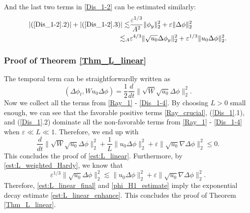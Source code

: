 \documentclass[reqno, 11pt]{amsart}
\theoremstyle{plain}
\theoremstyle{definition}
\theoremstyle{remark}
\numberwithin{equation}{section}
\begin{document}
And the last two terms in \eqref{Dis_1-2} can be estimated similarly:
\begin{equation}\label{Dis_1-4}
\begin{aligned}
|(\ref{Dis_1-2}.2)| + |(\ref{Dis_1-2}.3)| \lesssim & \frac{\varepsilon^{1/3}}{A^2}\|\phi_y\|_2^2 + \varepsilon \| \Delta \phi \|_2^2\\
\lesssim_A &  \varepsilon^{4/3} \|\sqrt{u_0} \Delta \phi_y\|_2^2 + \varepsilon^{1/3} \|u_0 \Delta \phi\|_2^2.
\end{aligned}
\end{equation}

\subsubsection{Proof of Theorem \ref{Thm_L_linear}} The temporal term can be straightforwardly written as
$$
(\Delta \phi_t, W u_0 \Delta \phi) = \frac{1}{2} \frac{d}{dt} \| \sqrt{W} \sqrt{u_0} \Delta \phi \|_2^2.
$$
Now we collect all the terms from \eqref{Ray_1} - \eqref{Dis_1-4}. By choosing  $L > 0$ small enough, we can see that the favorable positive terms \eqref{Ray_crucial}, (\ref{Dis_1}.1), and (\ref{Dis_1}.2) dominate all the non-favorable terms from \eqref{Ray_1} - \eqref{Dis_1-4} when $\varepsilon \ll L \ll 1$. Therefore, we end up with
\begin{equation}\label{est:L_linear_final}
\frac{d}{dt} \|\sqrt{W} \sqrt{u_0} \Delta \phi \|_2^2 + \frac{1}{L} \|u_0 \Delta \phi\|_2^2 + \varepsilon \| \sqrt{u_0} \nabla \Delta \phi \|_2^2 \le 0.
\end{equation}
This concludes the proof of \eqref{est:L_linear}. Furthermore, by \eqref{est:L_weighted_Hardy}, we know that
$$
\varepsilon^{1/3} \|\sqrt{u_0} \Delta \phi\|_2^2 \lesssim \|u_0 \Delta \phi\|_2^2 + \varepsilon \| \sqrt{u_0} \nabla \Delta \phi \|_2^2.
$$
Therefore, \eqref{est:L_linear_final} and \eqref{phi_H1_estimate} imply the exponential decay estimate \eqref{est:L_linear_enhance}. This concludes the proof of Theorem \ref{Thm_L_linear}.\\
\end{document}
